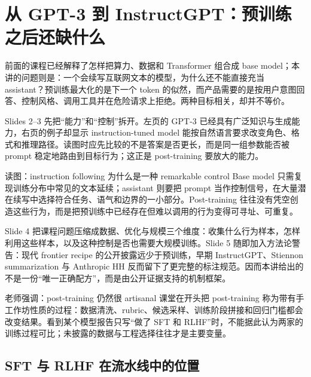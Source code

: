 \section{从 GPT-3 到 InstructGPT：预训练之后还缺什么}

前面的课程已经解释了怎样把算力、数据和 Transformer 组合成 base model；本讲的问题则是：一个会续写互联网文本的模型，为什么还不能直接充当 assistant？预训练最大化的是下一个 token 的似然，而产品需要的是按用户意图回答、控制风格、调用工具并在危险请求上拒绝。两种目标相关，却并不等价。


Slides 2--3 先把“能力”和“控制”拆开。左页的 GPT-3 已经具有广泛知识与生成能力，右页的例子却显示 instruction-tuned model 能按自然语言要求改变角色、格式和推理路径。读图时应先比较的不是答案是否更长，而是同一组参数能否被 prompt 稳定地路由到目标行为；这正是 post-training 要放大的能力。

\begin{knowledgebox}{读图：instruction following 为什么是一种 remarkable control}
Base model 只需复现训练分布中常见的文本延续；assistant 则要把 prompt 当作控制信号，在大量潜在续写中选择符合任务、语气和边界的一小部分。Post-training 往往没有凭空创造这些行为，而是把预训练中已经存在但难以调用的行为变得可寻址、可重复。
\end{knowledgebox}


Slide 4 把课程问题压缩成数据、优化与规模三个维度：收集什么行为样本，怎样利用这些样本，以及这种控制是否也需要大规模训练。Slide 5 随即加入方法论警告：现代 frontier recipe 的公开披露远少于预训练，早期 InstructGPT、Stiennon summarization 与 Anthropic HH 反而留下了更完整的标注规范。因而本讲给出的不是一份“唯一正确配方”，而是由公开证据支持的机制框架。

\begin{warningbox}{老师强调：post-training 仍然很 artisanal}
课堂在开头把 post-training 称为带有手工作坊性质的过程：数据清洗、rubric、候选采样、训练阶段拼接和回归门槛都会改变结果。看到某个模型报告只写“做了 SFT 和 RLHF”时，不能据此认为两家的训练过程可比；未披露的数据与工程选择往往才是主要变量。
\end{warningbox}

\subsection{SFT 与 RLHF 在流水线中的位置}

